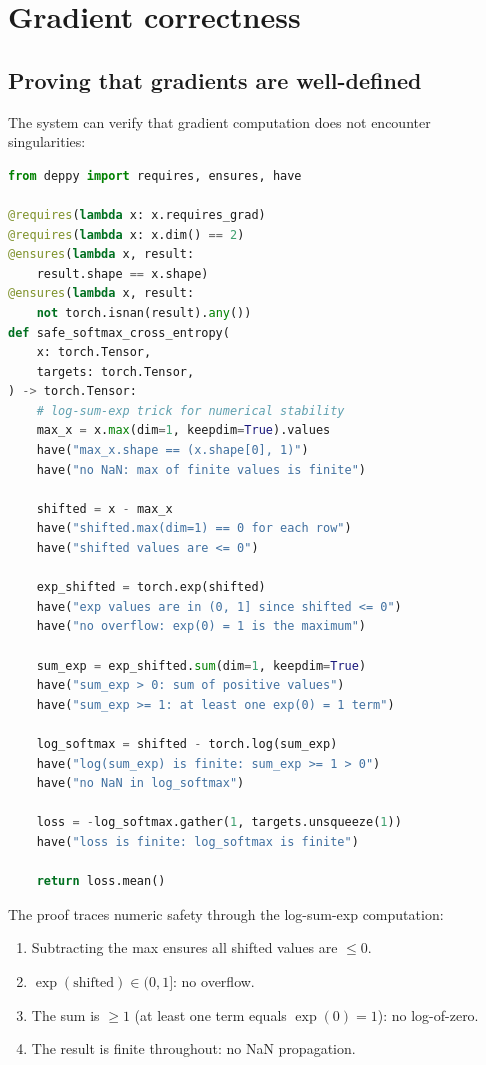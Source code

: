 \documentclass[11pt]{report}
\theoremstyle{definition}
\theoremstyle{plain}
\begin{document}
\section{Gradient correctness}

\subsection{Proving that gradients are well-defined}

The system can verify that gradient computation does not encounter
singularities:

\begin{lstlisting}[style=deppy,language=Python]
from deppy import requires, ensures, have

@requires(lambda x: x.requires_grad)
@requires(lambda x: x.dim() == 2)
@ensures(lambda x, result:
    result.shape == x.shape)
@ensures(lambda x, result:
    not torch.isnan(result).any())
def safe_softmax_cross_entropy(
    x: torch.Tensor,
    targets: torch.Tensor,
) -> torch.Tensor:
    # log-sum-exp trick for numerical stability
    max_x = x.max(dim=1, keepdim=True).values
    have("max_x.shape == (x.shape[0], 1)")
    have("no NaN: max of finite values is finite")

    shifted = x - max_x
    have("shifted.max(dim=1) == 0 for each row")
    have("shifted values are <= 0")

    exp_shifted = torch.exp(shifted)
    have("exp values are in (0, 1] since shifted <= 0")
    have("no overflow: exp(0) = 1 is the maximum")

    sum_exp = exp_shifted.sum(dim=1, keepdim=True)
    have("sum_exp > 0: sum of positive values")
    have("sum_exp >= 1: at least one exp(0) = 1 term")

    log_softmax = shifted - torch.log(sum_exp)
    have("log(sum_exp) is finite: sum_exp >= 1 > 0")
    have("no NaN in log_softmax")

    loss = -log_softmax.gather(1, targets.unsqueeze(1))
    have("loss is finite: log_softmax is finite")

    return loss.mean()
\end{lstlisting}

The proof traces numeric safety through the log-sum-exp computation:
\begin{enumerate}[nosep]
  \item Subtracting the max ensures all shifted values are $\leq 0$.
  \item $\exp(\text{shifted}) \in (0, 1]$: no overflow.
  \item The sum is $\geq 1$ (at least one term equals $\exp(0) = 1$): no
        log-of-zero.
  \item The result is finite throughout: no NaN propagation.
\end{enumerate}
\end{document}
